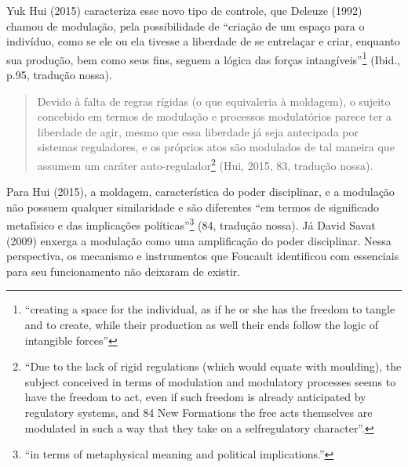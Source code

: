 Yuk Hui (2015) caracteriza esse novo tipo de controle, que Deleuze
(1992) chamou de modulação, pela possibilidade de ``criação de um espaço
para o indivíduo, como se ele ou ela tivesse a liberdade de se
entrelaçar e criar, enquanto sua produção, bem como seus fins, seguem a
lógica das forças intangíveis''\footnote{``creating a space for the
  individual, as if he or she has the freedom to tangle and to create,
  while their production as well their ends follow the logic of
  intangible forces''} (Ibid., p.95, tradução nossa).

\begin{quote}
Devido à falta de regras rígidas (o que equivaleria à moldagem), o
sujeito concebido em termos de modulação e processos modulatórios parece
ter a liberdade de agir, mesmo que essa liberdade já seja antecipada por
sistemas reguladores, e os próprios atos são modulados de tal maneira
que assumem um caráter auto-regulador\footnote{``Due to the lack of
  rigid regulations (which would equate with moulding), the subject
  conceived in terms of modulation and modulatory processes seems to
  have the freedom to act, even if such freedom is already anticipated
  by regulatory systems, and 84 New Formations the free acts themselves
  are modulated in such a way that they take on a selfregulatory
  character''.}
\protect\hypertarget{__Fieldmark__1580_1356454502}{}{}(Hui, 2015, 83,
tradução
nossa)\protect\hypertarget{__Fieldmark__686_193002426}{}{\protect\hypertarget{__Fieldmark__850_1743353457}{}{}}.
\end{quote}

Para Hui
\protect\hypertarget{__Fieldmark__1603_1356454502}{}{}(\protect\hypertarget{__Fieldmark__710_193002426}{}{}2\protect\hypertarget{__Fieldmark__859_1743353457}{}{}015),
a moldagem, característica do poder disciplinar, e a modulação não
possuem qualquer similaridade e são diferentes ``em termos de
significado metafísico e das implicações políticas''\footnote{``in terms
  of metaphysical meaning and political implications.''} (84, tradução
nossa). Já David Savat
\protect\hypertarget{__Fieldmark__1625_1356454502}{}{}(2009)\protect\hypertarget{__Fieldmark__730_193002426}{}{\protect\hypertarget{__Fieldmark__877_1743353457}{}{}}
enxerga a modulação como uma amplificação do poder disciplinar. Nessa
perspectiva, os mecanismo e instrumentos que Foucault identificou com
essenciais para seu funcionamento não deixaram de existir.~

